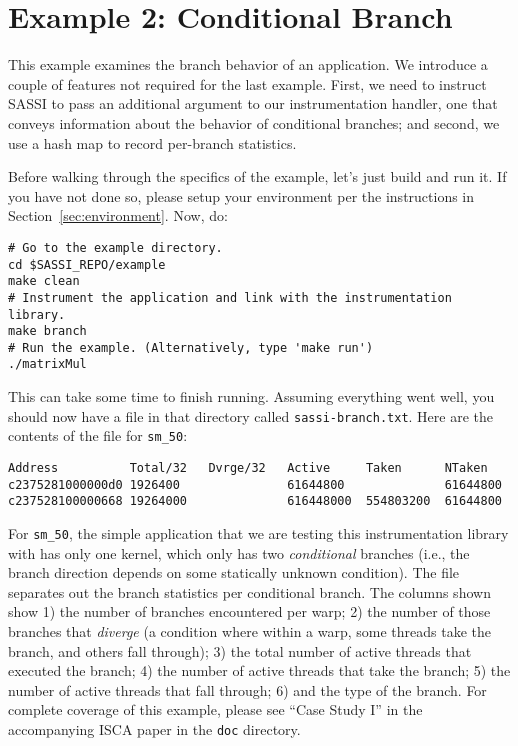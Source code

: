 \pagebreak
\section{Example 2: Conditional Branch}
\label{sec:example2}

This example examines the branch behavior of an application. We
introduce a couple of features not required for the last example.
First, we need to instruct SASSI to pass an additional argument to our
instrumentation handler, one that conveys information about the
behavior of conditional branches; and second, we use a hash map to
record per-branch statistics.

Before walking through the specifics of the example, let's just build
and run it. If you have not done so, please setup your environment
per the instructions in Section~\ref{sec:environment}.  Now, do:
\begin{lstlisting}[style=BashInputStyle]
# Go to the example directory.
cd $SASSI_REPO/example
make clean
# Instrument the application and link with the instrumentation library.
make branch
# Run the example. (Alternatively, type 'make run')
./matrixMul
\end{lstlisting}

This can take some time to finish running.  Assuming everything went
well, you should now have a file in that directory called
\texttt{sassi-branch.txt}.  Here are the contents of the file for
\texttt{sm\_50}:
\begin{verbatim}
Address          Total/32   Dvrge/32   Active     Taken      NTaken
c2375281000000d0 1926400               61644800              61644800
c237528100000668 19264000              616448000  554803200  61644800
\end{verbatim}
For \texttt{sm\_50}, the simple application that we are testing
this instrumentation library with has only one kernel, which only has
two \emph{conditional} branches (i.e., the branch direction depends on
some statically unknown condition).  The file separates out the branch
statistics per conditional branch.  The columns shown show 1) the number
of branches encountered per warp; 2) the number of those branches that
\emph{diverge} (a condition where within a warp, some threads take the
branch, and others fall through); 3) the total number of active
threads that executed the branch; 4) the number of active threads that
take the branch; 5) the number of active threads that fall through;
6) and the type of the branch.   For complete coverage of this
example, please see ``Case Study I'' in the accompanying ISCA paper
in the \texttt{doc} directory.

